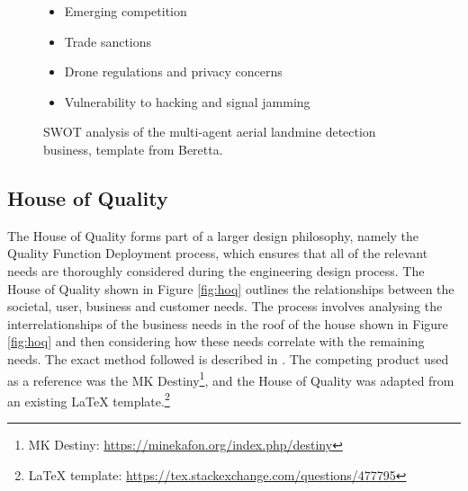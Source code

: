 \begin{figure}[H]
\begin{tcbraster}[raster columns=2, boxrule=0mm, arc=0mm]
\begin{tcolorbox}[equal height group=A, size=fbox, colback=swotT!60, colframe=swotT!80!black, title=\textsc{\textbf{THREATS}}]
\begin{itemize}
    \item Emerging competition
    \item Trade sanctions
    \item Drone regulations and privacy concerns
    \item Vulnerability to hacking and signal jamming
\end{itemize}
\end{tcolorbox}
\end{tcbraster}
\caption[SWOT analysis of the multi-agent aerial landmine detection business]{SWOT analysis of the multi-agent aerial landmine detection business, template from Beretta.}
\label{fig:swot}
\end{figure}


\subsection{House of Quality}
\label{hoq}

The House of Quality forms part of a larger design philosophy, namely the Quality Function Deployment process, which ensures that all of the relevant needs are thoroughly considered during the engineering design process. The House of Quality shown in Figure \ref{fig:hoq} outlines the relationships between the societal, user, business and customer needs. The process involves analysing the interrelationships of the business needs in the roof of the house shown in Figure \ref{fig:hoq} and then considering how these needs correlate with the remaining needs. The exact method followed is described in \cite{chanqfd}. The competing product used as a reference was the MK Destiny\footnote{MK Destiny: \url{https://minekafon.org/index.php/destiny}}, and the House of Quality was adapted from an existing {\LaTeX} template.\footnote{{\LaTeX} template: \url{https://tex.stackexchange.com/questions/477795}}




